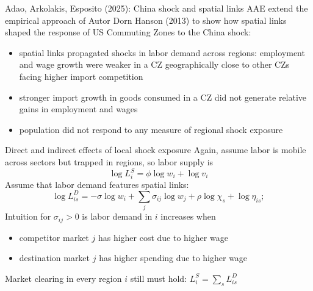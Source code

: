 \documentclass[11pt,notes=hide,aspectratio=169]{beamer}
\begin{document}
\begin{frame}{Adao, Arkolakis, Esposito (2025): China shock and spatial links}
AAE extend the empirical approach of Autor Dorn Hanson (2013) to show how spatial links shaped the response of US Commuting Zones to the China shock:
\begin{itemize}
\item spatial links propagated shocks in labor demand across regions: employment and wage growth were weaker in a CZ geographically close to other CZs facing higher import competition
\item stronger import growth in goods consumed in a CZ did not generate relative gains in employment and wages
\item population did not respond to any measure of regional shock exposure
\end{itemize}
\end{frame}
\begin{frame}{Direct and indirect effects of local shock exposure}
Again, assume labor is mobile across sectors but trapped in regions, so labor supply is
$$ \log L_{i}^{S}=\phi \log w_{i}+\log v_{i} $$
Assume that labor demand features spatial links:
$$ \log L_{is}^{D}=-\sigma \log w_{i}+\sum_{j}\sigma_{ij}\log w_{j}+\rho \log \chi_{s}+\log \eta_{is}; $$
Intuition for $\sigma_{ij}>0$ is labor demand in $i$ increases when
\begin{itemize}
    \item competitor market $j$ has higher cost due to higher wage 
    \item destination market $j$ has higher spending due to higher wage 
\end{itemize}
Market clearing in every region $i$ still must hold: $L_{i}^{S}=\sum_{s}L_{is}^{D}$
\end{frame}
\end{document}
